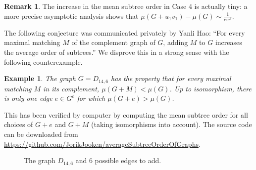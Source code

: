 \documentclass[11pt]{article}
\newtheorem{ex}[thr]{Example}
\theoremstyle{definition}
\newtheorem{remark}[thr]{Remark}
\def\a{\alpha}
\begin{document}
\begin{remark}
The increase in the mean subtree order in Case 4 is actually tiny: a more precise asymptotic analysis shows that $\mu(G + u_1v_1) - \mu(G) \sim \frac{1}{ew^3}$.
\end{remark}

The following conjecture was communicated privately by Yanli Hao: ``For every maximal matching $M$ of the complement graph of $G$, adding $M$ to $G$ increases the average order of subtrees.'' We disprove this in a strong sense with the following counterexample.

\begin{ex}
 The graph $G=D_{14,6}$ has the property that for every maximal matching $M$ in its complement, $\mu(G+M)<\mu(G)$. Up to isomorphism, there is only one edge $e \in G^c$ for which $\mu(G+e) >\mu(G)$.
\end{ex}

 This has been verified by computer by computing the mean subtree order for all choices of $G+e$ and $G+M$ (taking isomorphisms into account). The source code can be downloaded from \url{https://github.com/JorikJooken/averageSubtreeOrderOfGraphs}.

\begin{figure}[ht]
\centering
{}
\caption{The graph $D_{14,6}$ and $6$ possible edges to add.}\label{fig:D_{14,6}graph}
\end{figure}
\end{document}
